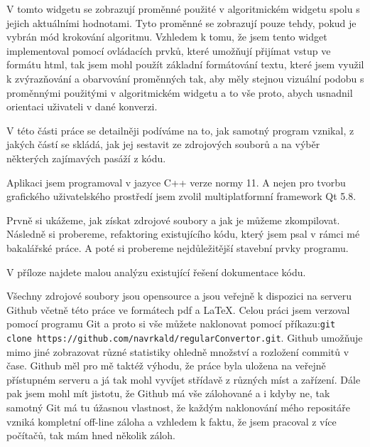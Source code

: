 

V tomto widgetu se zobrazují proměnné použité v algoritmickém widgetu spolu s jejich  aktuálními hodnotami. Tyto proměnné se zobrazují pouze tehdy, pokud je vybrán mód krokování algoritmu. Vzhledem k tomu, že jsem tento widget implementoval pomocí ovládacích prvků, které umožňují přijímat vstup ve formátu html, tak jsem mohl použít základní formátování textu, které jsem využil k zvýrazňování a obarvování proměnných tak, aby měly stejnou vizuální podobu s proměnnými použitými v algoritmickém widgetu a to vše proto, abych usnadnil orientaci uživateli v dané konverzi.


V této části práce se detailněji podíváme na to, jak samotný program vznikal, z jakých částí se skládá, jak jej sestavit ze zdrojových souborů a na výběr některých zajímavých pasáží z kódu.

Aplikaci jsem programoval v jazyce C++ verze normy 11. A nejen pro tvorbu grafického uživatelského prostředí jsem zvolil multiplatformní framework Qt 5.8.

Prvně si ukážeme, jak získat zdrojové soubory a jak je můžeme zkompilovat. Následně si probereme, refaktoring existujícího kódu, který jsem psal v rámci mé bakalářské práce. A poté si probereme nejdůležitější stavební prvky programu.

V příloze najdete malou analýzu existující řešení dokumentace kódu.


Všechny zdrojové soubory jsou opensource a jsou veřejně k dispozici na serveru Github včetně této práce ve formátech pdf a \LaTeX. Celou práci jsem verzoval pomocí programu Git a proto si vše můžete naklonovat pomocí příkazu:\newline \texttt{git clone https://github.com/navrkald/regularConvertor.git}. Github umožňuje mimo jiné zobrazovat různé statistiky ohledně množství a rozložení commitů v čase. Github měl pro mě taktéž výhodu, že práce byla uložena na veřejně přístupném serveru a já tak mohl vyvíjet střídavě z různých míst a zařízení. Dále pak jsem mohl mít jistotu, že Github má vše zálohované a i kdyby ne, tak samotný Git má tu úžasnou vlastnost, že každým naklonování mého repositáře vzniká kompletní off-line záloha a vzhledem k faktu, že jsem pracoval z více počítačů, tak mám hned několik záloh.

